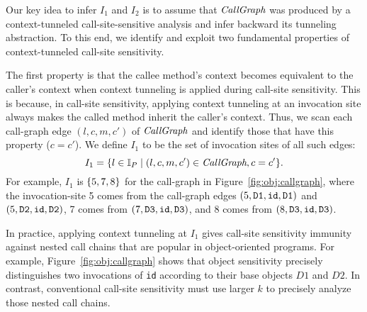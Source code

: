 Our key idea to infer $I_1$ and $I_2$ is to assume that $\textit{CallGraph}$ was produced by a context-tunneled
call-site-sensitive analysis and infer
backward its tunneling abstraction.
To this end, we identify and exploit two fundamental properties of context-tunneled call-site sensitivity.


The first property is that the callee method's context becomes
equivalent to the caller's context when context tunneling is applied during call-site sensitivity.
This is because, in call-site sensitivity, applying
context tunneling at an invocation site always makes the called
method inherit the caller's context.
Thus, we scan each call-graph edge $(l, c, m, c')$ of $\textit{CallGraph}$ and
identify those that have this property ($c=c'$). 
We define $I_1$ to be the set of invocation sites of all such edges:
\vspace{-3pt}
\[
I_1 = \myset{l \in \mbi_P \mid (l,c,m,c') \in \CallGraph, c = c'}.
\vspace{-3pt}\]
For example, $I_1$ is $\{ 5, 7, 8 \}$ for the call-graph in
Figure~\ref{fig:obj:callgraph}, where the invocation-site 5 comes from
the call-graph edges $(5,{\tt D1},\texttt{id}, {\tt D1})$ and
$(5,{\tt D2},\texttt{id}, {\tt D2})$,
7 comes from $(7,{\tt D3},\texttt{id},{\tt D3})$, and 8 comes from $(8,{\tt
  D3},\texttt{id},{\tt D3})$.



In practice, applying context tunneling at $I_1$ gives call-site
sensitivity immunity against nested call chains that are popular in
object-oriented programs. For example, Figure~\ref{fig:obj:callgraph} shows that
object sensitivity precisely distinguishes two invocations of {\tt id}
according to their base objects $D1$ and $D2$.  In contrast,
conventional call-site sensitivity must use larger $k$ to precisely
analyze those nested call chains. 






